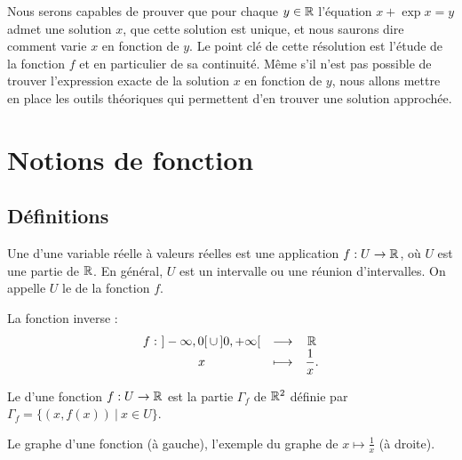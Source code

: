 \documentclass[class=report,crop=false]{standalone}
\begin{document}


Nous serons capables de prouver que pour chaque $y \in \mathbb{R}$
l'équation \og $x+\exp x = y$ \fg{} admet une solution $x$, que cette solution est unique,
et nous saurons dire comment varie $x$ en fonction de $y$.
Le point clé 
de cette résolution est l'étude de la fonction $f$ et en particulier de sa continuité.
Même s'il n'est pas possible de trouver l'expression exacte de la solution $x$ en fonction de $y$, nous allons mettre en place les outils théoriques qui permettent d'en trouver une solution approchée.



\section{Notions de fonction}

\subsection{Définitions}

\begin{definition}
Une  d'une variable réelle à valeurs réelles est une application
$f:U\to \mathbb{R}$, où $U$ est une partie de $\mathbb{R}$. En général, $U$ est un intervalle
ou une réunion d'intervalles. On appelle $U$ le  de
la fonction $f$.
\end{definition}

\begin{exemple}
La fonction inverse :
\[
\begin{array}{ccc}
f: \ ]-\infty,0[ \,\cup \, ]0,+\infty[ &\longrightarrow& \mathbb{R} \\
 x &\longmapsto& \dfrac1x.
 \end{array}
\]
\end{exemple}

Le  d'une fonction $f:U\to \mathbb{R}$ est la partie $\Gamma_f$
de $\mathbb{R}^2$ définie par $\Gamma_f=\big\{(x,f(x)) \ \vert \ x\in U\big\}$.


Le graphe d'une fonction (à gauche), l'exemple du graphe de $x \mapsto \frac1x$ (à droite).


\end{document}
